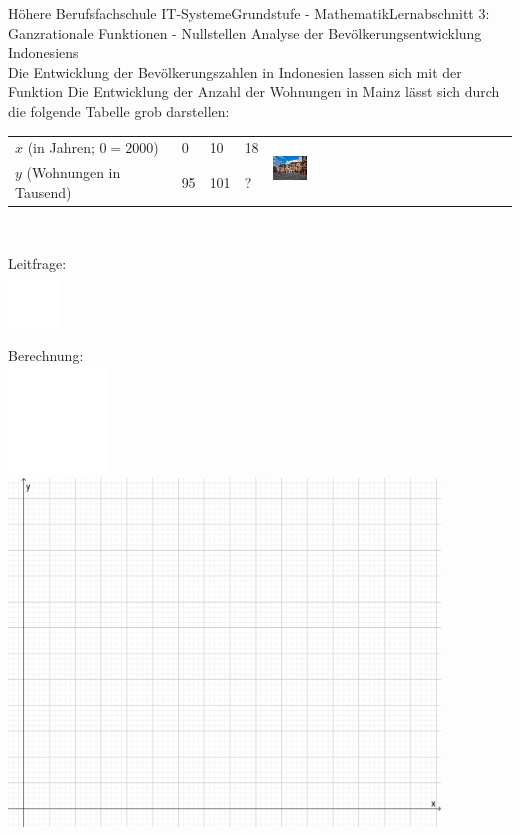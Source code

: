 \documentclass[oneside,openany,headings=optiontotoc,11pt,numbers=noenddot]{scrreprt}
\begin{document}
	\begin{worksheet}{Höhere Berufsfachschule IT-Systeme}{Grundstufe - Mathematik}{Lernabschnitt 3: Ganzrationale Funktionen - Nullstellen}
		\noindent
		\LARGE Analyse der Bevölkerungsentwicklung Indonesiens\\
		\normalsize
		\noindent
		Die Entwicklung der Bevölkerungszahlen in Indonesien lassen sich mit der Funktion Die Entwicklung der Anzahl der Wohnungen in Mainz lässt sich durch die folgende Tabelle grob darstellen:\\
		\par\noindent
		\begin{tabularx}{\columnwidth}{|X|l|l|l|M}
			\(x\) (in Jahren; \(0 = 2000\)) & 0 & 10 & 18 & \\
			\(y\) (Wohnungen in Tausend) & 95 & 101 & ?\\
		\end{tabularx}\\
		\begin{framed}
			\noindent
			\small{\color{codegray}Leitfrage:}\\
			\includegraphics[width=0.1\textwidth]{../../empty.jpg}\\
		\end{framed}
		\begin{framed}
			\noindent
			\small{\color{codegray}Berechnung:}\\
			\includegraphics[width=0.2\textwidth]{../../empty.jpg}\\
			\includegraphics[width=0.86\textwidth]{../99_Bilder/KoordLeer.png}

\end{framed}
\end{worksheet}
\end{document}
